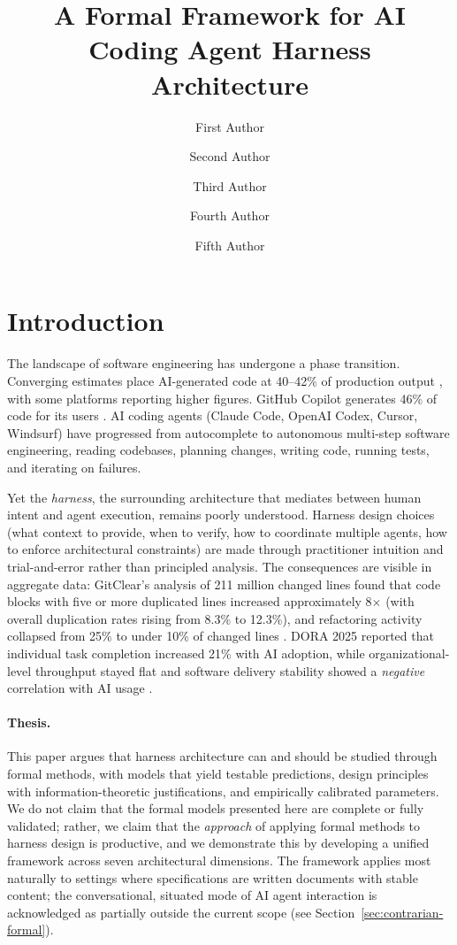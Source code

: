 \documentclass[11pt, a4paper, logo, copyright]{googledeepmind}
\title{A Formal Framework for AI Coding Agent Harness Architecture}
\author[1]{First Author}
\author[2]{Second Author}
\author[2]{Third Author}
\author[1]{Fourth Author}
\author[1]{Fifth Author}
\affil[*]{Equal Contribution}
\affil[1]{Affiliation 1}
\affil[2]{Affiliation 2}
\begin{document}
\maketitle

\section{Introduction}
\label{sec:intro}

The landscape of software engineering has undergone a phase transition. Converging estimates place AI-generated code at 40--42\% of production output \citep{gitclear2025, sonar2026}, with some platforms reporting higher figures. GitHub Copilot generates 46\% of code for its users \citep{github2024rct}. AI coding agents (Claude Code, OpenAI Codex, Cursor, Windsurf) have progressed from autocomplete to autonomous multi-step software engineering, reading codebases, planning changes, writing code, running tests, and iterating on failures.

Yet the \emph{harness}, the surrounding architecture that mediates between human intent and agent execution, remains poorly understood. Harness design choices (what context to provide, when to verify, how to coordinate multiple agents, how to enforce architectural constraints) are made through practitioner intuition and trial-and-error rather than principled analysis. The consequences are visible in aggregate data: GitClear's analysis of 211 million changed lines found that code blocks with five or more duplicated lines increased approximately 8$\times$ (with overall duplication rates rising from 8.3\% to 12.3\%), and refactoring activity collapsed from 25\% to under 10\% of changed lines \citep{gitclear2025}. DORA 2025 reported that individual task completion increased 21\% with AI adoption, while organizational-level throughput stayed flat and software delivery stability showed a \emph{negative} correlation with AI usage \citep{dora2025}.

\paragraph{Thesis.} This paper argues that harness architecture can and should be studied through formal methods, with models that yield testable predictions, design principles with information-theoretic justifications, and empirically calibrated parameters. We do not claim that the formal models presented here are complete or fully validated; rather, we claim that the \emph{approach} of applying formal methods to harness design is productive, and we demonstrate this by developing a unified framework across seven architectural dimensions. The framework applies most naturally to settings where specifications are written documents with stable content; the conversational, situated mode of AI agent interaction \citep{suchman1987plans} is acknowledged as partially outside the current scope (see Section~\ref{sec:contrarian-formal}).
\end{document}
